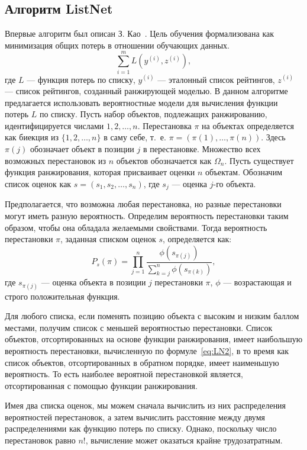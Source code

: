 \subsection{Алгоритм ListNet}
Впервые алгоритм был описан З. Као~\cite{ListNet}. Цель обучения формализована как минимизация общих потерь в отношении обучающих данных.
\begin{equation}
	\label{eq:LN1}
	\sum_{i=1}^m L(y^{(i)}, z^{(i)}),
\end{equation}
где $L$ --- функция потерь по списку, $y^{(i)}$ --- эталонный список рейтингов, $z^{(i)}$ --- список рейтингов, созданный ранжирующей моделью.
В данном алгоритме предлагается использовать вероятностные модели для вычисления функции потерь $L$ по списку. Пусть набор объектов, подлежащих ранжированию, идентифицируется числами $1, 2, \dots, n$. Перестановка $\pi$ на объектах определяется как биекция из $\{1, 2, \dots, n\}$ в саму себе, т.~е. $\pi=(\pi(1), \dots, \pi(n))$. Здесь $\pi(j)$ обозначает объект в позиции $j$ в перестановке. Множество всех возможных перестановок из $n$ объектов обозначается как $\Omega_n$. Пусть существует функция ранжирования, которая присваивает
оценки $n$ объектам. Обозначим список оценок как $s = (s_1, s_2, \dots, s_n)$, где $s_j$ --- оценка $j$-го объекта. 

Предполагается, что возможна любая перестановка, но разные перестановки могут иметь разную вероятность. Определим вероятность перестановки таким образом, чтобы она обладала желаемыми свойствами. Тогда вероятность перестановки $\pi$, заданная списком оценок $s$, определяется как:
\begin{equation}
	\label{eq:LN2}
	P_s(\pi)=\prod_{j=1}^n \frac{\phi(s_{\pi(j)})}{\sum_{k=j}^n \phi(s_{\pi(k)})},
\end{equation}
где $s_{\pi(j)}$ ---  оценка объекта в позиции $j$ перестановки $\pi$, $\phi$ --- возрастающая и строго положительная функция.

Для любого списка, если поменять позицию объекта с высоким и низким баллом местами, получим список с меньшей вероятностью перестановки. Список объектов, отсортированных на основе функции ранжирования, имеет наибольшую вероятность перестановки, вычисленную по формуле~\ref{eq:LN2}, в то время как список объектов, отсортированных в обратном порядке, имеет наименьшую вероятность. То есть наиболее вероятной перестановкой является, отсортированная с помощью функции ранжирования.

Имея два списка оценок, мы можем сначала вычислить из них распределения вероятностей перестановок, а затем вычислить расстояние между двумя распределениями как функцию потерь по списку. Однако, поскольку число перестановок равно $n!$, вычисление может оказаться крайне трудозатратным.

